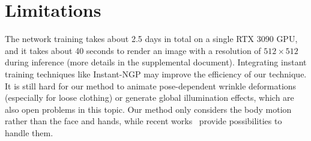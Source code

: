 \section{Limitations}
The network training takes about 2.5 days in total on a single RTX 3090 GPU, and it takes about 40 seconds to render an image with a resolution of $512\times 512$ during inference (more details in the supplemental document).
Integrating instant training techniques like Instant-NGP \cite{instant-ngp} may improve the efficiency of our technique.
It is still hard for our method to animate pose-dependent wrinkle deformations (especially for loose clothing) or generate global illumination effects, which are also open problems in this topic.
Our method only considers the body motion rather than the face and hands, while recent works~\cite{zheng2023avatarrex, shen2023xavatar} provide possibilities to handle them.

